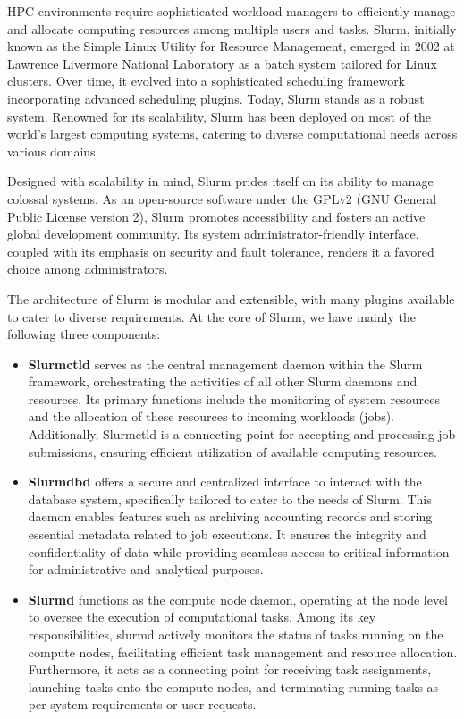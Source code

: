 HPC environments require sophisticated workload managers to efficiently manage and allocate computing resources among multiple users and tasks. Slurm, initially known as the Simple Linux Utility for Resource Management, emerged in 2002 at Lawrence Livermore National Laboratory as a batch system tailored for Linux clusters. Over time, it evolved into a sophisticated scheduling framework incorporating advanced scheduling plugins. Today, Slurm stands as a robust system. Renowned for its scalability, Slurm has been deployed on most of the world's largest computing systems, catering to diverse computational needs across various domains.

Designed with scalability in mind, Slurm prides itself on its ability to manage colossal systems. As an open-source software under the GPLv2 (GNU General Public License version 2), Slurm promotes accessibility and fosters an active global development community. Its system administrator-friendly interface, coupled with its emphasis on security and fault tolerance, renders it a favored choice among administrators.

The architecture of Slurm is modular and extensible, with many plugins available to cater to diverse requirements. At the core of Slurm, we have mainly the following three components:

\begin{itemize}
    \item \textbf{Slurmctld} serves as the central management daemon within the Slurm framework, orchestrating the activities of all other Slurm daemons and resources. Its primary functions include the monitoring of system resources and the allocation of these resources to incoming workloads (jobs). Additionally, Slurmctld is a connecting point for accepting and processing job submissions, ensuring efficient utilization of available computing resources.
    \item \textbf{Slurmdbd} offers a secure and centralized interface to interact with the database system, specifically tailored to cater to the needs of Slurm. This daemon enables features such as archiving accounting records and storing essential metadata related to job executions. It ensures the integrity and confidentiality of data while providing seamless access to critical information for administrative and analytical purposes.
    \item \textbf{Slurmd} functions as the compute node daemon, operating at the node level to oversee the execution of computational tasks. Among its key responsibilities, slurmd actively monitors the status of tasks running on the compute nodes, facilitating efficient task management and resource allocation. Furthermore, it acts as a connecting point for receiving task assignments, launching tasks onto the compute nodes, and terminating running tasks as per system requirements or user requests.
\end{itemize}

